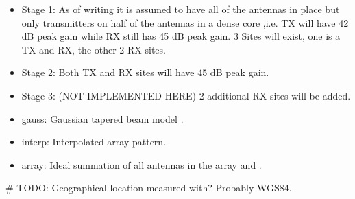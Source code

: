 \documentclass[letterpaper,10pt,english]{sphinxmanual}
\begin{document}
\begin{fulllineitems}
\begin{itemize}
\item {} 
Stage 1: As of writing it is assumed to have all of the antennas in place but only transmitters on half of the antennas in a dense core ,i.e. TX will have 42 dB peak gain while RX still has 45 dB peak gain. 3 Sites will exist, one is a TX and RX, the other 2 RX sites.

\item {} 
Stage 2: Both TX and RX sites will have 45 dB peak gain.

\item {} 
Stage 3: (NOT IMPLEMENTED HERE) 2 additional RX sites will be added.

\end{itemize}

\begin{itemize}
\item {} 
gauss: Gaussian tapered beam model {\hyperref[\detokenize{modules/antenna_library:antenna_library.planar_beam}]{}}.

\item {} 
interp: Interpolated array pattern.

\item {} 
array: Ideal summation of all antennas in the array {\hyperref[\detokenize{modules/antenna_library:antenna_library.e3d_array_beam_stage1}]{}} and {\hyperref[\detokenize{modules/antenna_library:antenna_library.e3d_array_beam}]{}}.

\end{itemize}

\# TODO: Geographical location measured with? Probably WGS84.

\end{fulllineitems}

\end{document}

